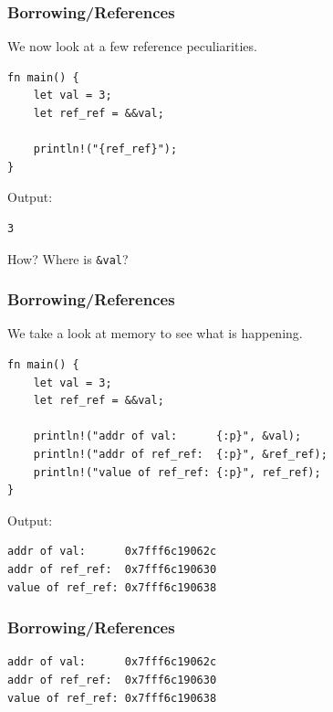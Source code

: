 \begin{frame}[fragile]
    \frametitle{Borrowing/References}
    We now look at a few reference peculiarities.
    \vfill
    \begin{verbatim}
fn main() {
    let val = 3;
    let ref_ref = &&val;

    println!("{ref_ref}");
}
    \end{verbatim}
    \vfill
    Output:
    \begin{verbatim}
3
    \end{verbatim}
    \pause
    \vfill
    How? Where is \texttt{\&val}?
\end{frame}


\begin{frame}[fragile]
    \frametitle{Borrowing/References}
    We take a look at memory to see what is happening.
    \pause
    \vfill
    \begin{verbatim}
fn main() {
    let val = 3;
    let ref_ref = &&val;

    println!("addr of val:      {:p}", &val);
    println!("addr of ref_ref:  {:p}", &ref_ref);
    println!("value of ref_ref: {:p}", ref_ref);
}
    \end{verbatim}
    \vfill
    Output:
    \begin{verbatim}
addr of val:      0x7fff6c19062c
addr of ref_ref:  0x7fff6c190630
value of ref_ref: 0x7fff6c190638
    \end{verbatim}
\end{frame}

\begin{frame}[fragile]
    \frametitle{Borrowing/References}
    \begin{verbatim}
addr of val:      0x7fff6c19062c
addr of ref_ref:  0x7fff6c190630
value of ref_ref: 0x7fff6c190638
    \end{verbatim}
    \pause
    \begin{center}
    \end{center}
\end{frame}

